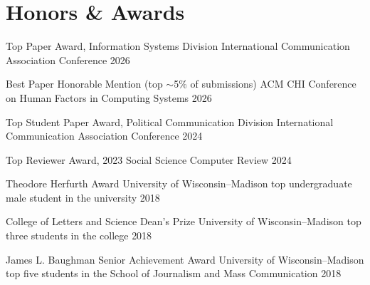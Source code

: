 \section{Honors \& Awards}


\cvaward
  {Top Paper Award, Information Systems Division}
  {International Communication Association Conference}
  {}
  {2026}

\cvaward
  {Best Paper Honorable Mention (top $\sim$5\% of submissions)}
  {ACM CHI Conference on Human Factors in Computing Systems}
  {}
  {2026}

\cvaward
  {Top Student Paper Award, Political Communication Division}
  {International Communication Association Conference}
  {}
  {2024}

\cvaward
  {Top Reviewer Award, 2023}
  {Social Science Computer Review}
  {}
  {2024}

\cvaward
  {Theodore Herfurth Award}
  {University of Wisconsin--Madison \textperiodcentered{} top undergraduate male student in the university}
  {}
  {2018}

\cvaward
  {College of Letters and Science Dean's Prize}
  {University of Wisconsin--Madison \textperiodcentered{} top three students in the college}
  {}
  {2018}

\cvaward
  {James L. Baughman Senior Achievement Award}
  {University of Wisconsin--Madison \textperiodcentered{} top five students in the School of Journalism and Mass Communication}
  {}
  {2018}
